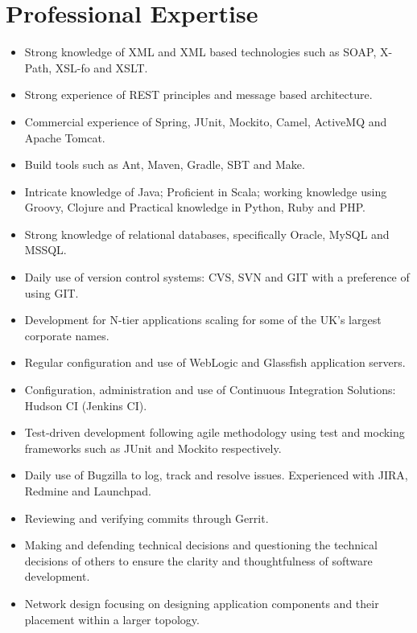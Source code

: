 \documentclass[a4paper,10pt]{moderncv}
\begin{document}
\section{Professional Expertise}
\begin{itemize}
\item Strong knowledge of XML and XML based technologies such as SOAP, X-Path, XSL-fo and XSLT.
\item Strong experience of REST principles and message based architecture.
\item Commercial experience of Spring, JUnit, Mockito, Camel, ActiveMQ and Apache Tomcat.
\item Build tools such as Ant, Maven, Gradle, SBT and Make.
\item Intricate knowledge of Java; Proficient in Scala; working knowledge using Groovy, Clojure and Practical knowledge in Python, Ruby and PHP.
\item Strong knowledge of relational databases, specifically Oracle, MySQL and MSSQL.
\item Daily use of version control systems: CVS, SVN and GIT with a preference of using GIT.
\item Development for N-tier applications scaling for some of the UK's largest corporate names.
\item Regular configuration and use of WebLogic and Glassfish application servers.
\item Configuration, administration and use of Continuous Integration
Solutions: Hudson CI (Jenkins CI).
\item Test-driven development following agile methodology using test and mocking frameworks such as JUnit and Mockito respectively.
\item Daily use of Bugzilla to log, track and resolve issues. Experienced with JIRA, Redmine and Launchpad.
\item Reviewing and verifying commits through Gerrit.
\item Making and defending technical decisions and questioning the technical decisions of others to ensure the clarity and thoughtfulness of software development.
\item Network design focusing on designing application components and their placement within a larger topology.
\end{itemize}
\end{document}
